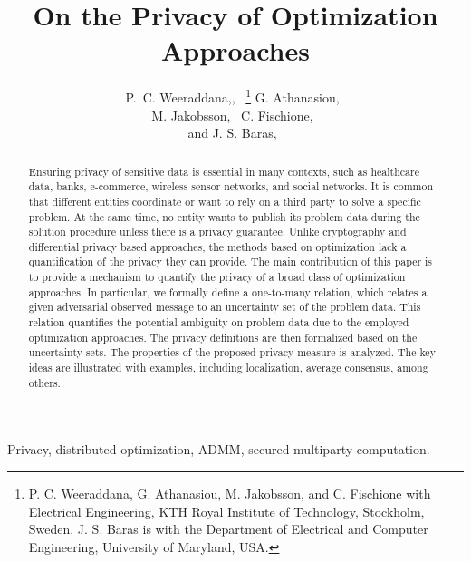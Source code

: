 \documentclass[12pt,draftcls,onecolumn]{IEEEtran}
\newcommand{\addnew}[1]{{{\color{blue!0!black}#1}}}
\begin{document}
 \title{\addnew{On the Privacy of Optimization Approaches}}
\author{P.~C. Weeraddana,,~
\thanks{P. C. Weeraddana, G. Athanasiou, M. Jakobsson, and C. Fischione with Electrical Engineering, KTH Royal Institute of Technology, Stockholm, Sweden. J. S. Baras is with the Department of Electrical and Computer Engineering, University of Maryland, USA. }
G. Athanasiou,~ \\ M. Jakobsson,~  C. Fischione,~ \\ and J. S. Baras,~
}





\maketitle


\setlength{\baselineskip}{21pt}

\vspace{-10mm}
\begin{abstract}
\addnew{
Ensuring privacy of sensitive data is essential in many contexts, such as healthcare data, banks, e-commerce, wireless sensor networks, and social networks. It is common that different entities coordinate or want to rely on a third party to solve a specific problem. At the same time, no entity wants to publish its problem data during the solution procedure unless there is a privacy guarantee. Unlike cryptography and differential privacy based approaches, the methods based on optimization lack a quantification of the privacy they can provide. The main contribution of this paper is to provide a mechanism to quantify the privacy of a broad class of optimization approaches. In particular, we formally define a one-to-many relation, which relates a given adversarial observed message to an uncertainty set of the problem data. This relation quantifies the potential ambiguity on problem data due to the employed optimization approaches. The privacy definitions are then formalized based on the uncertainty sets. The properties of the proposed privacy measure is analyzed. The key ideas are illustrated with examples, including localization, average consensus, among others. 





}
\end{abstract}
\vspace{4mm}
\begin{keywords}\vspace{-0mm}
Privacy, distributed optimization, ADMM, secured multiparty computation.
\end{keywords}
\end{document}

